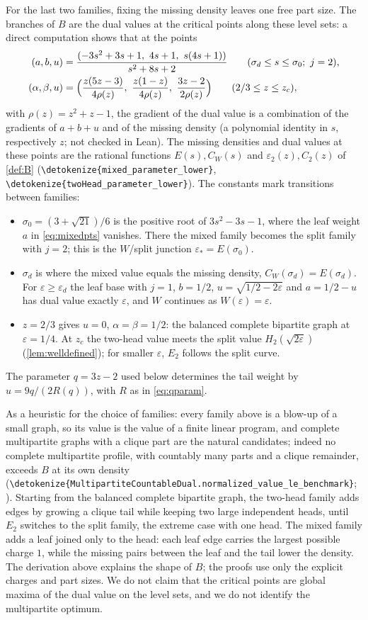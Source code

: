 \documentclass[10pt]{article}
\theoremstyle{definition}
\theoremstyle{remark}
\numberwithin{equation}{section}
\newcommand{\eps}{\varepsilon}
\newcommand{\leanid}[1]{\expandafter\nolinkurl\expandafter{\detokenize{#1}}}
\newcommand{\Fm}[1]{\cite[#1]{Formalization}}
\begin{document}
For the last two families, fixing the missing density leaves one free part size. The branches of $B$ are the dual values at the critical points along these level sets: a direct computation shows that at the points
\begin{align}
 (a,b,u)&=\frac{(-3s^2+3s+1,\ 4s+1,\ s(4s+1))}{s^2+8s+2}\qquad(\sigma_d\le s\le\sigma_0;\ j=2),\label{eq:mixedpts}\\
 (\alpha,\beta,u)&=\Bigl(\frac{z(5z-3)}{4\rho(z)},\ \frac{z(1-z)}{4\rho(z)},\ \frac{3z-2}{2\rho(z)}\Bigr)\qquad(2/3\le z\le z_c),\label{eq:twoheadpts}
\end{align}
with $\rho(z)=z^2+z-1$, the gradient of the dual value is a combination of the gradients of $a+b+u$ and of the missing density (a polynomial identity in $s$, respectively $z$; not checked in Lean). The missing densities and dual values at these points are the rational functions $E(s),C_W(s)$ and $\eps_2(z),C_2(z)$ of \cref{def:B} (\leanid{mixed_parameter_lower}, \leanid{twoHead_parameter_lower}). The constants mark transitions between families:
\begin{itemize}[leftmargin=1.5em]
\item $\sigma_0=(3+\sqrt{21})/6$ is the positive root of $3s^2-3s-1$, where the leaf weight $a$ in \eqref{eq:mixedpts} vanishes. There the mixed family becomes the split family with $j=2$; this is the $W$/split junction $\eps_*=E(\sigma_0)$.
\item $\sigma_d$ is where the mixed value equals the missing density, $C_W(\sigma_d)=E(\sigma_d)$. For $\eps\ge\eps_d$ the leaf base with $j=1$, $b=1/2$, $u=\sqrt{1/2-2\eps}$ and $a=1/2-u$ has dual value exactly $\eps$, and $W$ continues as $W(\eps)=\eps$.
\item $z=2/3$ gives $u=0$, $\alpha=\beta=1/2$: the balanced complete bipartite graph at $\eps=1/4$. At $z_c$ the two-head value meets the split value $H_2(\sqrt{2\eps})$ (\cref{lem:welldefined}); for smaller $\eps$, $E_2$ follows the split curve.
\end{itemize}
The parameter $q=3z-2$ used below determines the tail weight by $u=9q/(2R(q))$, with $R$ as in \eqref{eq:qparam}.

As a heuristic for the choice of families: every family above is a blow-up of a small graph, so its value is the value of a finite linear program, and complete multipartite graphs with a clique part are the natural candidates; indeed no complete multipartite profile, with countably many parts and a clique remainder, exceeds $B$ at its own density (\leanid{MultipartiteCountableDual.normalized_value_le_benchmark};~\Fm{\S7}). Starting from the balanced complete bipartite graph, the two-head family adds edges by growing a clique tail while keeping two large independent heads, until $E_2$ switches to the split family, the extreme case with one head. The mixed family adds a leaf joined only to the head: each leaf edge carries the largest possible charge $1$, while the missing pairs between the leaf and the tail lower the density. The derivation above explains the shape of $B$; the proofs use only the explicit charges and part sizes. We do not claim that the critical points are global maxima of the dual value on the level sets, and we do not identify the multipartite optimum.
\end{document}
